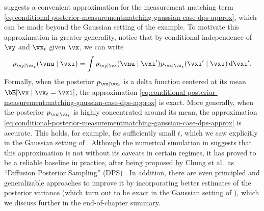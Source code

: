 \documentclass[../../book-main.tex]{subfiles}
\begin{document}
 suggests a convenient
approximation for the measurement matching term
\eqref{eq:conditional-posterior-measurementmatching-gaussian-case-dps-approx},
which can be made beyond the Gaussian setting of the example. To
motivate this approximation in greater generality, notice that
by conditional independence of $\vy$ and $\vx_t$ given $\vx$, we can write
\begin{equation}
  p_{\vy \mid \vx_t}(\vnu \mid \vxi)
  =
  \int p_{\vy \mid \vx}(\vnu \mid \vxi') p_{\vx \mid \vx_t}(\vxi' \mid \vxi)
  \odif  \vxi'.
\end{equation}
Formally, when the posterior $p_{\vx\mid \vx_t}$ is a delta function centered at
its mean $\bE[\vx \mid \vx_t=\vxi]$, the approximation
\eqref{eq:conditional-posterior-measurementmatching-gaussian-case-dps-approx} is
exact. More generally, when the posterior $p_{\vx \mid \vx_t}$ is highly
concentrated around its mean, the approximation
\eqref{eq:conditional-posterior-measurementmatching-gaussian-case-dps-approx} is
accurate. This holds, for example, for sufficiently small $t$, which we saw
explicitly in the Gaussian setting of
.
Although the numerical simulation in
 suggests that this
approximation is not without its caveats in certain regimes, it has proved to be
a reliable baseline in practice, after being proposed by Chung et al.\ as
``Diffusion Posterior Sampling'' (DPS) \cite{chung2023diffusion}.
In addition, there are even principled and generalizable approaches to improve it by
incorporating better estimates of the posterior variance (which turn out to be
exact in the Gaussian setting of ),
which we discuss further in the end-of-chapter summary. 
\end{document}
